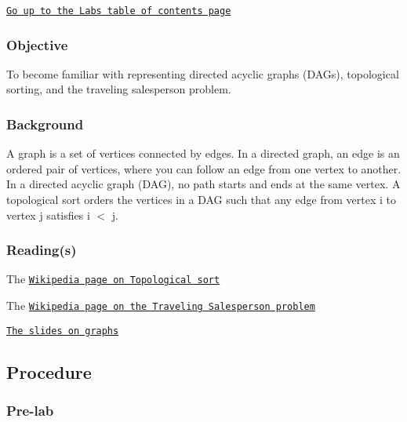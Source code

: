 \href{../index.html}{\tt Go up to the Labs table of contents page}

\subsubsection*{Objective}

To become familiar with representing directed acyclic graphs (D\+A\+Gs), topological sorting, and the traveling salesperson problem.

\subsubsection*{Background}

A graph is a set of vertices connected by edges. In a directed graph, an edge is an ordered pair of vertices, where you can follow an edge from one vertex to another. In a directed acyclic graph (D\+AG), no path starts and ends at the same vertex. A topological sort orders the vertices in a D\+AG such that any edge from vertex i to vertex j satisfies i $<$ j.

\subsubsection*{Reading(s)}


\begin{DoxyEnumerate}
\item The \href{http://en.wikipedia.org/wiki/Topological_sort}{\tt Wikipedia page on Topological sort}
\item The \href{http://en.wikipedia.org/wiki/Travelling_salesman_problem}{\tt Wikipedia page on the Traveling Salesperson problem}
\item \href{../../slides/11-graphs.html}{\tt The slides on graphs}
\end{DoxyEnumerate}

\subsection*{Procedure }

\subsubsection*{Pre-\/lab}


